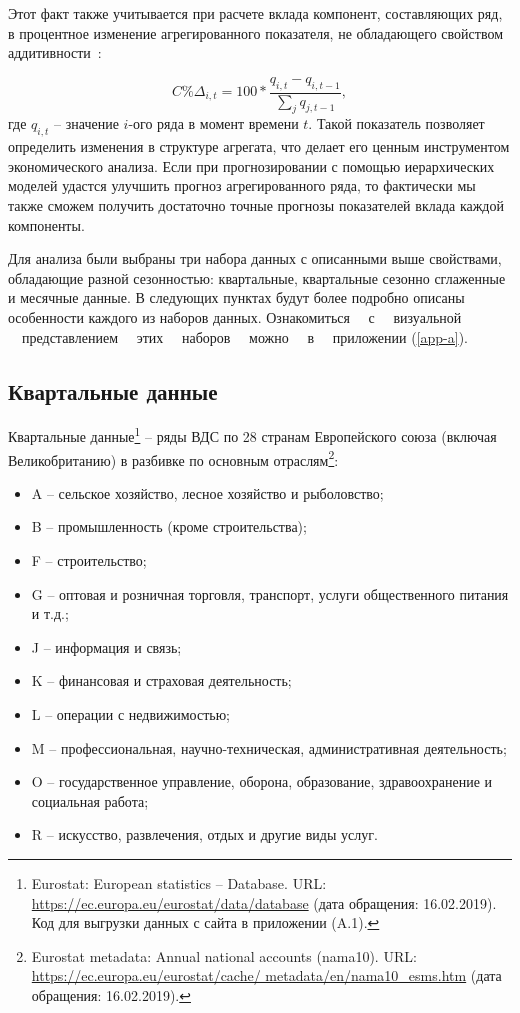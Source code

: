 \documentclass[12pt,a4paper, oneside]{extreport}
\begin{document}
Этот  факт также учитывается при расчете вклада компонент, составляющих ряд, в процентное изменение агрегированного показателя, не обладающего свойством аддитивности~\cite{bea3}:  

\begin{equation}\label{key}
 C\% Δ_{i,t} = 100 * \dfrac{q_{i,t}-q_{i,t-1} }{\sum_j q_{j,t-1} } ,
\end{equation}
\noindent
где $q_{i,t}$ -- значение $i$-ого ряда в момент времени $t$.
Такой показатель позволяет определить изменения в структуре агрегата, что делает его ценным инструментом экономического анализа.
Если при прогнозировании с помощью иерархических моделей удастся улучшить прогноз агрегированного ряда, то фактически мы также сможем получить достаточно точные прогнозы показателей вклада каждой компоненты.

Для анализа были выбраны три набора данных с описанными выше свойствами, обладающие  разной сезонностью:  квартальные, квартальные сезонно сглаженные и месячные данные. В следующих пунктах будут более подробно   описаны особенности каждого из наборов данных. Ознакомиться  \ \ с  \ \ визуальной  \ \ представлением  \ \ этих \ \ наборов \ \ можно \ \  в \ \
приложении (\ref{app-a}).


\subsection{Квартальные данные}

Квартальные данные\footnote{Eurostat: European statistics -- Database. URL: \url{https://ec.europa.eu/eurostat/data/database} (дата обращения: 16.02.2019). Код для выгрузки данных с сайта в приложении (A.1).} -- ряды ВДС по 28 странам Европейского союза (включая Великобританию) в разбивке по основным отраслям\footnote{Eurostat metadata: Annual national accounts (nama10). URL: \url{https://ec.europa.eu/eurostat/cache/
	metadata/en/nama10\_esms.htm} (дата обращения: 16.02.2019).}:

\begin{itemize}
	\item  A --    сельское хозяйство, лесное хозяйство и рыболовство;
\item  B --  промышленность (кроме строительства);
\item  F --  строительство;
\item  G -- оптовая и розничная торговля, транспорт, услуги общественного питания и т.д.;
\item  J -- информация и связь;
\item  K -- финансовая и страховая деятельность;
\item  L -- операции с недвижимостью;
\item  M -- профессиональная, научно-техническая, административная деятельность;
\item  O -- государственное управление, оборона, образование, здравоохранение и социальная работа;
\item  R -- искусство, развлечения, отдых и другие виды услуг. 


\end{itemize}
\end{document}
